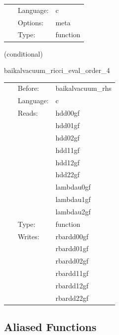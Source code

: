  \begin{tabular*}{160mm}{cll} 
~ & Language:  & c \\ 
~ & Options:  & meta \\ 
~ & Type:  & function \\ 
\end{tabular*} 


\vspace{5mm}

   (conditional) 

\hspace{5mm} baikalvacuum\_ricci\_eval\_order\_4 

\hspace{5mm}{\it compute ricci tensor, needed for bssn rhss, at finite-differencing order 4 } 


\hspace{5mm}

 \begin{tabular*}{160mm}{cll} 
~ & Before:  & baikalvacuum\_rhs \\ 
~ & Language:  & c \\ 
~ & Reads:  & hdd00gf \\ 
~& ~ &hdd01gf\\ 
~& ~ &hdd02gf\\ 
~& ~ &hdd11gf\\ 
~& ~ &hdd12gf\\ 
~& ~ &hdd22gf\\ 
~& ~ &lambdau0gf\\ 
~& ~ &lambdau1gf\\ 
~& ~ &lambdau2gf\\ 
~ & Type:  & function \\ 
~ & Writes:  & rbardd00gf \\ 
~& ~ &rbardd01gf\\ 
~& ~ &rbardd02gf\\ 
~& ~ &rbardd11gf\\ 
~& ~ &rbardd12gf\\ 
~& ~ &rbardd22gf\\ 
\end{tabular*} 


\subsection*{Aliased Functions}

\hspace{5mm}

